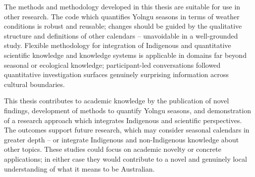 The methods and methodology developed in this thesis are suitable for use in
other research.  The code which quantifies Yolngu seasons in terms of weather
conditions is robust and reusable; changes should be guided by the qualitative
structure and definitions of other calendars -- unavoidable in a well-grounded
study.  Flexible methodology for integration of Indigenous and quantitative
scientific knowledge and knowledge systems is applicable in domains far beyond
seasonal or ecological knowledge; participant-led conversations followed
quantitative investigation surfaces genuinely surprising information across
cultural boundaries.


This thesis contributes to academic knowledge by the publication of novel
findings, development of methods to quantify Yolngu seasons, and demonstration
of a research approach which integrates Indigenous and scientific perspectives.
%
The outcomes support future research, which may consider seasonal calendars
in greater depth -- or integrate Indigenous and non-Indigenous knowledge about
other topics.  These studies could focus on academic novelty or concrete
applications; in either case they would contribute to a novel and genuinely
local understanding of what it means to be Australian.

